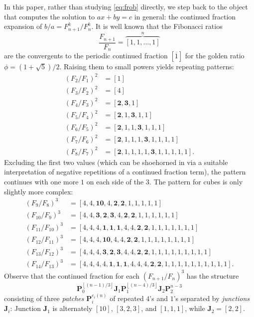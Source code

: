 \documentclass{article}
\numberwithin{equation}{section}
\theoremstyle{definition}
\theoremstyle{remark}
\newcommand{\floor}[1]{\left\lfloor #1 \right\rfloor}
\newcommand{\<}{\left\langle}
\renewcommand{\>}{\right\rangle}
\begin{document}
In this paper, rather than studying \eqref{eq:frob} directly, we step back to the object that computes the solution to $a x + b y = c$ in general: the continued fraction expansion of $b/a = F_{n+1}^k/F_n^k$. It is well known that the Fibonacci ratios
\begin{equation} \label{eq:fib_1}
  \frac{F_{n+1}}{F_n} = \overbrace{[1,1,\ldots,1]}^n
\end{equation}
are the convergents to the periodic continued fraction $[\overline{1}]$ for the golden ratio $\phi = (1 + \sqrt{5})/2$. Raising them to small powers yields repeating patterns:
\begin{equation} \label{eq:fib_2}
  \begin{aligned}
    (F_2/F_1)^2 &= [1] \\
    (F_3/F_2)^2 &= [4] \\
    (F_4/F_3)^2 &= [\mathbf{2}, \mathbf{3}, 1] \\
    (F_5/F_4)^2 &= [\mathbf{2}, 1, \mathbf{3}, 1, 1] \\
    (F_6/F_5)^2 &= [\mathbf{2}, 1, 1, \mathbf{3}, 1, 1, 1] \\
    (F_7/F_6)^2 &= [\mathbf{2}, 1, 1, 1, \mathbf{3}, 1, 1, 1, 1] \\
    (F_8/F_7)^2 &= [\mathbf{2}, 1, 1, 1, 1, \mathbf{3}, 1, 1, 1, 1, 1].
  \end{aligned}
\end{equation}
Excluding the first two values (which can be shoehorned in via a suitable interpretation of negative repetitions of a continued fraction term), the pattern continues with one more $1$ on each side of the $3$. The pattern for cubes is only slightly more complex:
\begin{equation}\label{eq:fib_3}
  \begin{aligned}
    (F_9/F_8)^3 &= [4,4,\mathbf{10},4,\mathbf{2},\mathbf{2},1,1,1,1,1] \\
    (F_{10}/F_9)^3 &= [4,4,\mathbf{3},\mathbf{2},\mathbf{3},4,\mathbf{2},\mathbf{2},1,1,1,1,1,1] \\
    (F_{11}/F_{10})^3 &= [4,4,4,\mathbf{1},\mathbf{1},\mathbf{1},4,4,\mathbf{2},\mathbf{2},1,1,1,1,1,1,1] \\
    (F_{12}/F_{11})^3 &= [4,4,4,\mathbf{10},4,4,\mathbf{2},\mathbf{2},1,1,1,1,1,1,1,1] \\
    (F_{13}/F_{12})^3 &= [4,4,4,\mathbf{3},\mathbf{2},\mathbf{3},4,4,\mathbf{2},\mathbf{2},1,1,1,1,1,1,1,1,1] \\
    (F_{14}/F_{13})^3 &= [4,4,4,4,\mathbf{1},\mathbf{1},\mathbf{1},4,4,4,\mathbf{2},\mathbf{2},1,1,1,1,1,1,1,1,1,1].
  \end{aligned}
\end{equation}
Observe that the continued fraction for each $(F_{n+1}/F_n)^3$ has the structure
\begin{equation}
  \mathbf{P}_0^{\floor{(n-1)/3}} \mathbf{J}_1 \mathbf{P}_1^{\floor{(n-4)/3}} \mathbf{J}_2 \mathbf{P}_2^{n-3}
\end{equation}
consisting of three \emph{patches} $\mathbf{P}_i^{e_i(n)}$ of repeated $4$'s and $1$'s separated by \emph{junctions} $\mathbf{J}_i$: Junction $\mathbf{J}_1$ is alternately $[10]$, $[3, 2, 3]$, and $[1,1,1]$, while $\mathbf{J}_2 = [2, 2]$.
\end{document}
